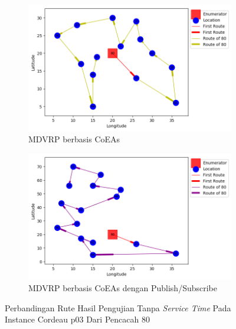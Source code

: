 \begin{figure}[H]
	\centering
	\begin{subfigure}[t]{\textwidth}
		\centering
		\includegraphics[width=\textwidth]{Resources/Images/cordeau_p03/cordeau_p03_notw_80_coes}
		\caption{MDVRP berbasis CoEAs}
		\label{fig:cordeau_p03_notw_80_coes}
	\end{subfigure}
	\begin{subfigure}[t]{\textwidth}
		\centering
		\includegraphics[width=\textwidth]{Resources/Images/cordeau_p03/cordeau_p03_notw_80_pubsub_coes}
		\caption{MDVRP berbasis CoEAs dengan Publish/Subscribe}
		\label{fig:cordeau_p03_notw_80_pubsub_coes}
	\end{subfigure}
	\caption{Perbandingan Rute Hasil Pengujian Tanpa \textit{Service Time} Pada Instance Cordeau p03 Dari Pencacah 80}
	\label{fig:cordeau_p03_notw_80}
\end{figure}


